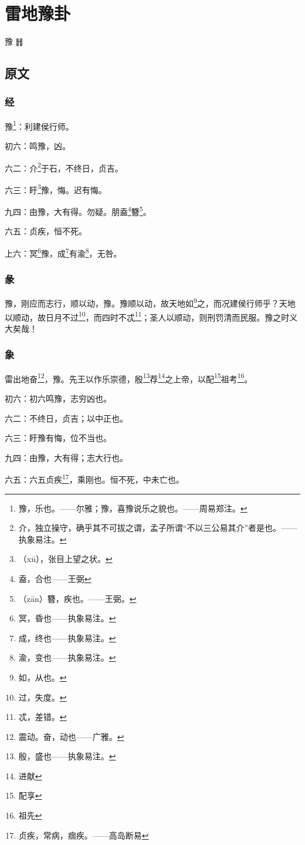 \documentclass[12pt,oneside]{book}
\begin{document}
\chapter{雷地豫卦}
豫 {\Large ䷏}

\section{原文}

\subsection{经}
豫\footnote{豫，乐也。——尔雅；豫，喜豫说乐之貌也。——周易郑注。}：利建侯行师。

初六：鸣豫，凶。

六二：介\footnote{介，独立操守，确乎其不可拔之谓，孟子所谓“不以三公易其介”者是也。——执象易注。}于石，不终日，贞吉。

六三：盱\footnote{（xū），张目上望之状。}豫，悔。迟有悔。

九四：由豫，大有得。勿疑。朋盍\footnote{盍，合也——王弼}簪\footnote{（zān）簪，疾也。——王弼。}。

六五：贞疾，恒不死。

上六：冥\footnote{冥，昏也——执象易注。}豫，成\footnote{成，终也——执象易注。}有渝\footnote{渝，变也——执象易注。}，无咎。

\subsection{彖}
豫，刚应而志行，顺以动，豫。豫顺以动，故天地如\footnote{如，从也。}之，而况建侯行师乎？天地以顺动，故日月不过\footnote{过，失度。}，而四时不忒\footnote{忒，差错。}；圣人以顺动，则刑罚清而民服。豫之时义大矣哉！

\subsection{象}
雷出地奋\footnote{震动。奋，动也——广雅。}，豫。先王以作乐崇德，殷\footnote{殷，盛也——执象易注。}荐\footnote{进献}之上帝，以配\footnote{配享}祖考\footnote{祖先}。

初六：初六鸣豫，志穷凶也。

六二：不终日，贞吉；以中正也。

六三：盱豫有悔，位不当也。

九四：由豫，大有得；志大行也。

六五：六五贞疾\footnote{贞疾，常病，痼疾。——高岛断易}，乘刚也。恒不死，中未亡也。
\end{document}

